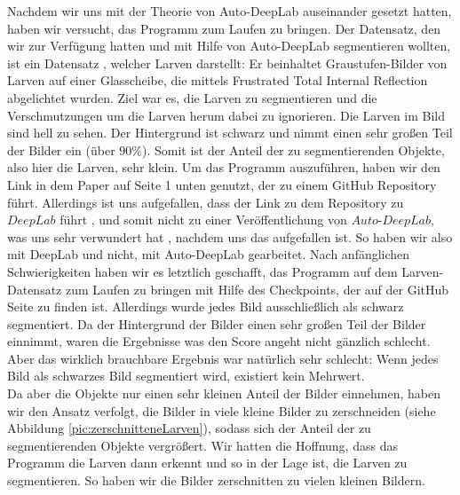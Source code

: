 Nachdem wir uns mit der Theorie von Auto-DeepLab auseinander gesetzt hatten, haben wir versucht, das Programm zum Laufen zu bringen. Der Datensatz, den wir zur Verfügung hatten und mit Hilfe von Auto-DeepLab segmentieren wollten, ist ein Datensatz \cite{larven}, welcher Larven  darstellt: Er beinhaltet Graustufen-Bilder von Larven auf einer Glasscheibe, die mittels Frustrated Total Internal Reflection abgelichtet wurden. Ziel war es, die Larven zu segmentieren und die Verschmutzungen um die Larven herum dabei zu ignorieren. Die Larven im Bild sind hell zu sehen. Der Hintergrund ist schwarz und nimmt einen sehr großen Teil der Bilder ein (über $90\%$). Somit ist der Anteil der zu segmentierenden Objekte, also hier die Larven, sehr klein. Um das Programm auszuführen, haben wir den Link in dem Paper \cite{autodeeplabPaper} auf Seite 1 unten genutzt, der zu einem GitHub Repository führt. Allerdings ist uns aufgefallen, dass der Link zu dem Repository zu $\textit{DeepLab}$ führt \cite{deeplabGithub}, und somit nicht zu einer Veröffentlichung von $\textit{Auto-DeepLab}$, was uns sehr verwundert hat  , nachdem uns das aufgefallen ist. So haben wir also mit DeepLab und nicht, mit Auto-DeepLab gearbeitet. Nach anfänglichen Schwierigkeiten haben wir es letztlich geschafft, das Programm auf dem Larven-Datensatz zum Laufen zu bringen mit Hilfe des Checkpoints, der auf der GitHub Seite zu finden ist. Allerdings wurde jedes Bild ausschließlich als schwarz segmentiert. Da der Hintergrund der Bilder einen sehr großen Teil der Bilder einnimmt, waren die Ergebnisse was den Score angeht nicht gänzlich schlecht. Aber das wirklich brauchbare Ergebnis war natürlich sehr schlecht: Wenn jedes Bild als schwarzes Bild segmentiert wird, existiert kein Mehrwert.\\
Da aber die Objekte nur einen sehr kleinen Anteil der Bilder einnehmen, haben wir den Ansatz verfolgt, die Bilder in viele kleine Bilder zu zerschneiden (siehe Abbildung \ref{pic:zerschnitteneLarven}), sodass sich der Anteil der zu segmentierenden Objekte vergrößert. Wir hatten die Hoffnung, dass das Programm die Larven dann erkennt und so in der Lage ist, die Larven zu segmentieren. So haben wir die Bilder zerschnitten zu vielen kleinen Bildern.

